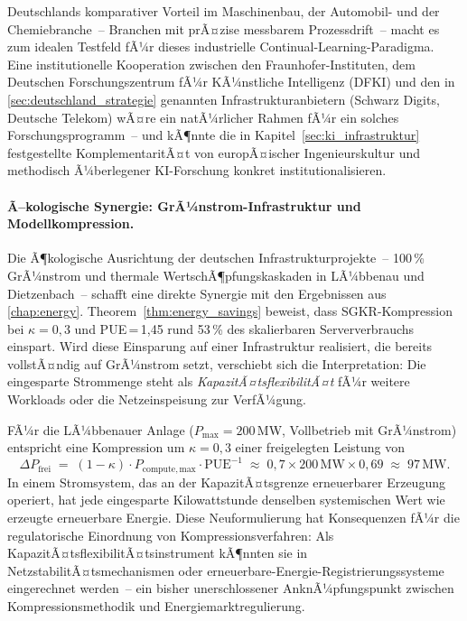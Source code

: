 ﻿\documentclass[12pt, a4paper, openany]{report}
\begin{document}
Deutschlands komparativer Vorteil im Maschinenbau, der Automobil- und
der Chemiebranche~-- Branchen mit prÃ¤zise messbarem
Prozessdrift~-- macht es zum idealen Testfeld fÃ¼r dieses industrielle
Continual-Learning-Paradigma.  Eine institutionelle Kooperation zwischen
den Fraunhofer-Instituten, dem Deutschen Forschungszentrum fÃ¼r
KÃ¼nstliche Intelligenz (DFKI) und den in
\cref{sec:deutschland_strategie} genannten Infrastrukturanbietern
(Schwarz Digits, Deutsche Telekom) wÃ¤re ein natÃ¼rlicher Rahmen fÃ¼r ein
solches Forschungsprogramm~-- und kÃ¶nnte die in
Kapitel~\ref{sec:ki_infrastruktur} festgestellte KomplementaritÃ¤t von
europÃ¤ischer Ingenieurskultur und methodisch Ã¼berlegener KI-Forschung
konkret institutionalisieren.

\paragraph{Ã–kologische Synergie: GrÃ¼nstrom-Infrastruktur und
  Modellkompression.}
Die Ã¶kologische Ausrichtung der deutschen Infrastrukturprojekte~--
100\,\% GrÃ¼nstrom und thermale WertschÃ¶pfungskaskaden in LÃ¼bbenau
und Dietzenbach~-- schafft eine direkte Synergie mit den Ergebnissen
aus \cref{chap:energy}.  Theorem~\ref{thm:energy_savings} beweist,
dass SGKR-Kompression bei $\kappa = 0{,}3$ und PUE\,=\,1{,}45 rund
53\,\% des skalierbaren Serververbrauchs einspart.  Wird diese
Einsparung auf einer Infrastruktur realisiert, die bereits vollstÃ¤ndig
auf GrÃ¼nstrom setzt, verschiebt sich die Interpretation: Die eingesparte
Strommenge steht als \emph{KapazitÃ¤tsflexibilitÃ¤t} fÃ¼r weitere
Workloads oder die Netzeinspeisung zur VerfÃ¼gung.

FÃ¼r die LÃ¼bbenauer Anlage ($P_{\mathrm{max}} = 200$\,MW, Vollbetrieb
mit GrÃ¼nstrom) entspricht eine Kompression um $\kappa = 0{,}3$ einer
freigelegten Leistung von
\[
  \Delta P_{\mathrm{frei}}
  \;=\; (1 - \kappa) \cdot P_{\mathrm{compute,max}} \cdot \mathrm{PUE}^{-1}
  \;\approx\; 0{,}7 \times 200\,\mathrm{MW} \times 0{,}69
  \;\approx\; 97\,\mathrm{MW}.
\]
In einem Stromsystem, das an der KapazitÃ¤tsgrenze erneuerbarer Erzeugung
operiert, hat jede eingesparte Kilowattstunde denselben systemischen
Wert wie erzeugte erneuerbare Energie.  Diese Neuformulierung hat
Konsequenzen fÃ¼r die regulatorische Einordnung von
Kompressionsverfahren: Als KapazitÃ¤tsflexibilitÃ¤tsinstrument kÃ¶nnten
sie in NetzstabilitÃ¤tsmechanismen oder
erneuerbare-Energie-Registrierungssysteme eingerechnet werden~-- ein
bisher unerschlossener AnknÃ¼pfungspunkt zwischen Kompressionsmethodik
und Energiemarktregulierung.
\end{document}
